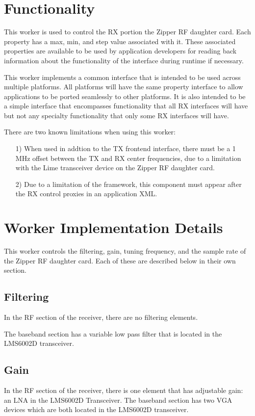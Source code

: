 \documentclass{article}
\begin{document}
\section*{Functionality}
\begin{flushleft}
	This worker is used to control the RX portion the Zipper RF daughter card.  Each property has a max, min, and step value associated with it.  These associated properties are available to be used by application developers for reading back information about the functionality of the interface during runtime if necessary.\par\medskip
	This worker implements a common interface that is intended to be used across multiple platforms.  All platforms will have the same property interface to allow applications to be ported seamlessly to other platforms.  It is also intended to be a simple interface that encompasses functionality that all RX interfaces will have but not any specialty functionality that only some RX interfaces will have.\par\medskip
	There are two known limitations when using this worker:
	\begin{itemize}
		\item[1)] When used in addtion to the TX frontend interface, there must be a 1 MHz offset between the TX and RX center frequencies, due to a limitation with the Lime transceiver device on the Zipper RF daughter card.
		\item[2)] Due to a limitation of the framework, this component must appear after the RX control proxies in an application XML.
	\end{itemize}

\section*{Worker Implementation Details}
This worker controls the filtering, gain, tuning frequency, and the sample rate of the Zipper RF daughter card.  Each of these are described below in their own section.
\end{flushleft}
\subsection*{Filtering}
In the RF section of the receiver, there are no filtering elements.\par\medskip
\noindent The baseband section has a variable low pass filter that is located in the LMS6002D transceiver.
\subsection*{Gain}
In the RF section of the receiver, there is one element that has adjustable gain: an LNA in the LMS6002D Transceiver.
\noindent The baseband section has two VGA devices which are both located in the LMS6002D transceiver.
\end{document}
